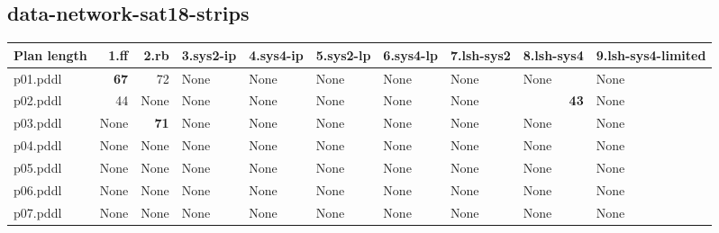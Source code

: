\documentclass{article}
\begin{document}
\hypertarget{plan_length-data-network-sat18-strips}{}
\subsection*{data-network-sat18-strips}

\begin{tabular}{@{}lrrrrrrrrr@{}}
Plan length & 1.ff & 2.rb & 3.sys2-ip & 4.sys4-ip & 5.sys2-lp & 6.sys4-lp & 7.lsh-sys2 & 8.lsh-sys4 & 9.lsh-sys4-limited \\
\midrule
p01.pddl & \textbf{67} & 72 & \multicolumn{1}{|l|}{None} & \multicolumn{1}{|l|}{None} & \multicolumn{1}{|l|}{None} & \multicolumn{1}{|l|}{None} & \multicolumn{1}{|l|}{None} & \multicolumn{1}{|l|}{None} & \multicolumn{1}{|l|}{None} \\
p02.pddl & 44 & \multicolumn{1}{|l|}{None} & \multicolumn{1}{|l|}{None} & \multicolumn{1}{|l|}{None} & \multicolumn{1}{|l|}{None} & \multicolumn{1}{|l|}{None} & \multicolumn{1}{|l|}{None} & \textbf{43} & \multicolumn{1}{|l|}{None} \\
p03.pddl & \multicolumn{1}{|l|}{None} & \textbf{71} & \multicolumn{1}{|l|}{None} & \multicolumn{1}{|l|}{None} & \multicolumn{1}{|l|}{None} & \multicolumn{1}{|l|}{None} & \multicolumn{1}{|l|}{None} & \multicolumn{1}{|l|}{None} & \multicolumn{1}{|l|}{None} \\
p04.pddl & \multicolumn{1}{|l|}{None} & \multicolumn{1}{|l|}{None} & \multicolumn{1}{|l|}{None} & \multicolumn{1}{|l|}{None} & \multicolumn{1}{|l|}{None} & \multicolumn{1}{|l|}{None} & \multicolumn{1}{|l|}{None} & \multicolumn{1}{|l|}{None} & \multicolumn{1}{|l|}{None} \\
p05.pddl & \multicolumn{1}{|l|}{None} & \multicolumn{1}{|l|}{None} & \multicolumn{1}{|l|}{None} & \multicolumn{1}{|l|}{None} & \multicolumn{1}{|l|}{None} & \multicolumn{1}{|l|}{None} & \multicolumn{1}{|l|}{None} & \multicolumn{1}{|l|}{None} & \multicolumn{1}{|l|}{None} \\
p06.pddl & \multicolumn{1}{|l|}{None} & \multicolumn{1}{|l|}{None} & \multicolumn{1}{|l|}{None} & \multicolumn{1}{|l|}{None} & \multicolumn{1}{|l|}{None} & \multicolumn{1}{|l|}{None} & \multicolumn{1}{|l|}{None} & \multicolumn{1}{|l|}{None} & \multicolumn{1}{|l|}{None} \\
p07.pddl & \multicolumn{1}{|l|}{None} & \multicolumn{1}{|l|}{None} & \multicolumn{1}{|l|}{None} & \multicolumn{1}{|l|}{None} & \multicolumn{1}{|l|}{None} & \multicolumn{1}{|l|}{None} & \multicolumn{1}{|l|}{None} & \multicolumn{1}{|l|}{None} & \multicolumn{1}{|l|}{None} \\

\end{tabular}
\end{document}
